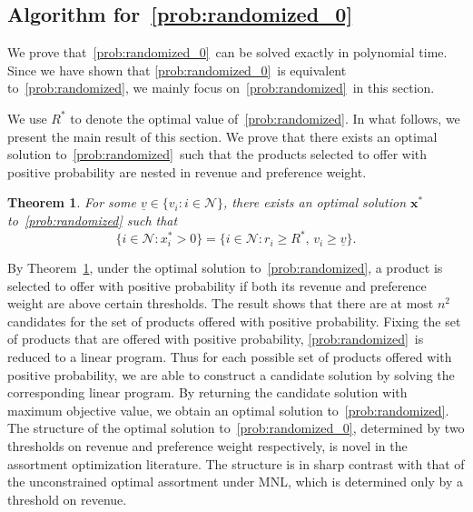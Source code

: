 \documentclass[mnsc,non-blindrev]{informs3}
\newtheorem{theorem}{Theorem}[section]
\theoremstyle{definition}
\begin{document}
\subsection{Algorithm for~\ref{prob:randomized_0}}\label{sec:alg_randomized}

We prove that~\ref{prob:randomized_0}~can be solved exactly in polynomial time. Since we have shown that \ref{prob:randomized_0}~is equivalent to~\ref{prob:randomized}, we mainly focus on~\ref{prob:randomized}~in this section.

We use $R^*$ to denote the optimal value of~\ref{prob:randomized}. In what follows, we present the main result of this section. We prove that there exists an optimal solution to~\ref{prob:randomized}~such that the products selected to offer with positive probability are nested in revenue and preference weight.

\vspace{0.5em}

\begin{theorem}\label{thm:randomized}
For some $\underline{v}\in\{v_i:i\in\mathcal{N}\}$, there exists an optimal solution $\bm{x}^*$ to~\ref{prob:randomized} such that
\begin{equation*}
\{i\in\mathcal{N}:x_i^*>0\}=\{i\in\mathcal{N}:r_i\geq R^*,\,v_i\geq \underline{v}\}.
\end{equation*}
\end{theorem}

\vspace{0.5em}

By Theorem~\ref{thm:randomized}, under the optimal solution to~\ref{prob:randomized}, a product is selected to offer with positive probability if both its revenue and preference weight are above certain thresholds. The result shows that there are at most $n^2$ candidates for the set of products offered with positive probability. Fixing the set of products that are offered with positive probability, \ref{prob:randomized}~is reduced to a linear program. Thus for each possible set of products offered with positive probability, we are able to construct a candidate solution by solving the corresponding linear program. By returning the candidate solution with maximum objective value, we obtain an optimal solution to~\ref{prob:randomized}. The structure of the optimal solution to~\ref{prob:randomized_0}, determined by two thresholds on revenue and preference weight respectively, is novel in the assortment optimization literature. The structure is in sharp contrast with that of the unconstrained optimal assortment under MNL, which is determined only by a threshold on revenue.
\end{document}
